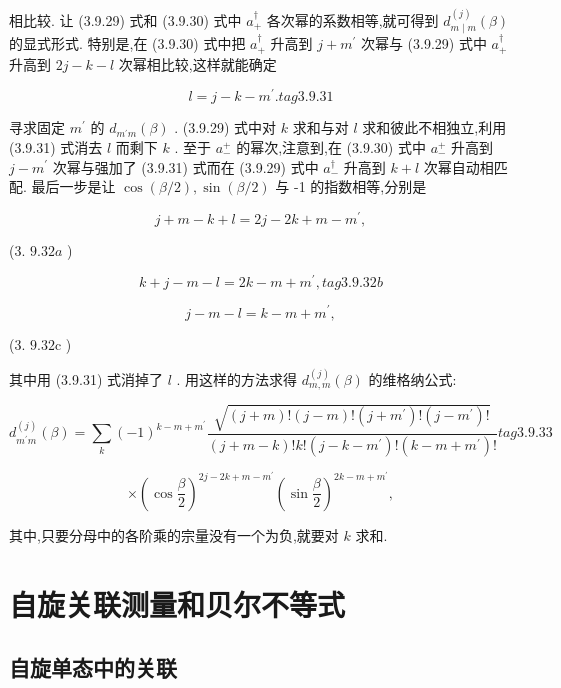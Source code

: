 相比较. 让 (3.9.29) 式和 (3.9.30) 式中 ${a}_{ + }^{ \dagger }$ 各次幂的系数相等,就可得到 ${d}_{m \mid m}^{\left( j\right) }\left( \beta \right)$ 的显式形式. 特别是,在 (3.9.30) 式中把 ${a}_{ + }^{ \dagger }$ 升高到 $j + {m}^{\prime }$ 次幂与 (3.9.29) 式中 ${a}_{ + }^{ \dagger }$ 升高到 ${2j} - k - l$ 次幂相比较,这样就能确定

$$
l = j - k - {m}^{\prime }. tag{3. 9.31}
$$

寻求固定 ${m}^{\prime }$ 的 ${d}_{{m}^{\prime }m}\left( \beta \right)$ . (3.9.29) 式中对 $k$ 求和与对 $l$ 求和彼此不相独立,利用 (3.9.31) 式消去 $l$ 而剩下 $k$ . 至于 ${a}_{ - }^{ + }$ 的幂次,注意到,在 (3.9.30) 式中 ${a}_{ - }^{ + }$ 升高到 $j - {m}^{\prime }$ 次幂与强加了 (3.9.31) 式而在 (3.9.29) 式中 ${a}_{ - }^{ \dagger }$ 升高到 $k + l$ 次幂自动相匹配. 最后一步是让 $\cos \left( {\beta /2}\right) ,\sin \left( {\beta /2}\right)$ 与 -1 的指数相等,分别是

$$
j + m - k + l = {2j} - {2k} + m - {m}^{\prime },
$$

(3. ${9.32a}$ )

$$
k + j - m - l = {2k} - m + {m}^{\prime }, tag{3. 9.32b}
$$

$$
j - m - l = k - m + {m}^{\prime },
$$

(3. ${9.32}\mathrm{c}$ )

其中用 (3.9.31) 式消掉了 $l$ . 用这样的方法求得 ${d}_{m, m}^{\left( j\right) }\left( \beta \right)$ 的维格纳公式:

$$
{d}_{{m}^{\prime }m}^{\left( j\right) }\left( \beta \right) = \mathop{\sum }\limits_{k}{\left( -1\right) }^{k - m + {m}^{\prime }}\frac{\sqrt{\left( {j + m}\right) !\left( {j - m}\right) !\left( {j + {m}^{\prime }}\right) !\left( {j - {m}^{\prime }}\right) !}}{\left( {j + m - k}\right) !k!\left( {j - k - {m}^{\prime }}\right) !\left( {k - m + {m}^{\prime }}\right) !} tag{3. 9.33}
$$

$$
\times {\left( \cos \frac{\beta }{2}\right) }^{{2j} - {2k} + m - {m}^{\prime }}{\left( \sin \frac{\beta }{2}\right) }^{{2k} - m + {m}^{\prime }},
$$

其中,只要分母中的各阶乘的宗量没有一个为负,就要对 $k$ 求和.

\section{自旋关联测量和贝尔不等式}
\subsection{自旋单态中的关联}

